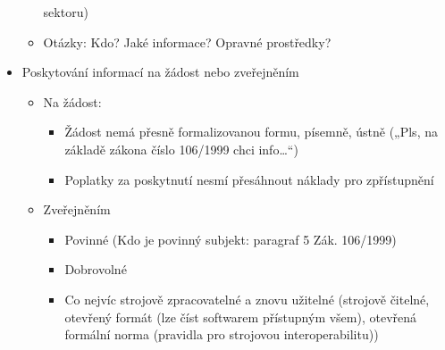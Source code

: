 \begin{itemize}
\begin{itemize}
sektoru)
    \item Otázky: Kdo? Jaké informace? Opravné prostředky?
\end{itemize}
    \item Poskytování informací na žádost nebo zveřejněním
    \begin{itemize}
        \item  Na žádost:
        \begin{itemize}
            \item Žádost nemá přesně formalizovanou formu, písemně, ústně („Pls, na základě
zákona číslo 106/1999 chci info…“)
            \item Poplatky za poskytnutí nesmí přesáhnout náklady pro zpřístupnění
        \end{itemize}
        \item Zveřejněním
        \begin{itemize}
            \item Povinné (Kdo je povinný subjekt: paragraf 5 Zák. 106/1999)
            \item Dobrovolné
            \item Co nejvíc strojově zpracovatelné a znovu užitelné (strojově čitelné, otevřený
formát (lze číst softwarem přístupným všem), otevřená formální norma
(pravidla pro strojovou interoperabilitu))
        \end{itemize}
    \end{itemize}
\end{itemize}

